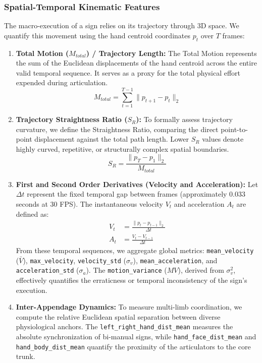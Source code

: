 \documentclass{ieeeaccess}
\begin{document}
\subsubsection{Spatial-Temporal Kinematic Features}
The macro-execution of a sign relies on its trajectory through 3D space. We quantify this movement using the hand centroid coordinates $p_t$ over $T$ frames:
\begin{enumerate}
    \item \textbf{Total Motion ($M_{total}$) / Trajectory Length:} The Total Motion represents the sum of the Euclidean displacements of the hand centroid across the entire valid temporal sequence. It serves as a proxy for the total physical effort expended during articulation. 
    \begin{equation} \label{eq:totalmotion} 
    M_{total} = \sum_{t=1}^{T-1} \lVert p_{t+1} - p_t \rVert_2 
    \end{equation}
    
    \item \textbf{Trajectory Straightness Ratio ($S_R$):} To formally assess trajectory curvature, we define the Straightness Ratio, comparing the direct point-to-point displacement against the total path length. Lower $S_R$ values denote highly curved, repetitive, or structurally complex spatial boundaries.
    \begin{equation} \label{eq:straightness}
    S_R = \frac{\lVert p_T - p_1 \rVert_2}{M_{total}}
    \end{equation}
    
    \item \textbf{First and Second Order Derivatives (Velocity and Acceleration):} Let $\Delta t$ represent the fixed temporal gap between frames (approximately $0.033$ seconds at 30 FPS). The instantaneous velocity $V_t$ and acceleration $A_t$ are defined as: 
    \begin{align} 
    V_t &= \frac{\lVert p_t - p_{t-1} \rVert_2}{\Delta t} \label{eq:velocity} \\ 
    A_t &= \frac{V_t - V_{t-1}}{\Delta t} \label{eq:acceleration} 
    \end{align} 
    From these temporal sequences, we aggregate global metrics: \texttt{mean\_velocity} ($\bar{V}$), \texttt{max\_velocity}, \texttt{velocity\_std} ($\sigma_v$), \texttt{mean\_acceleration}, and \texttt{acceleration\_std} ($\sigma_a$). The \texttt{motion\_variance} ($MV$), derived from $\sigma_v^2$, effectively quantifies the erraticness or temporal inconsistency of the sign's execution.
    
    \item \textbf{Inter-Appendage Dynamics:} To measure multi-limb coordination, we compute the relative Euclidean spatial separation between diverse physiological anchors. The \texttt{left\_right\_hand\_dist\_mean} measures the absolute synchronization of bi-manual signs, while \texttt{hand\_face\_dist\_mean} and \\ \texttt{hand\_body\_dist\_mean} quantify the proximity of the articulators to the core trunk.
\end{enumerate}
\end{document}
